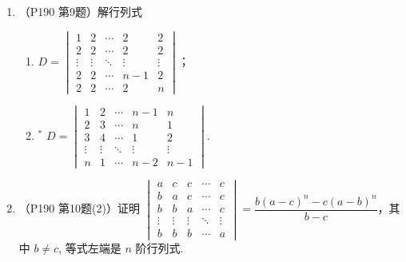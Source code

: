 \begin{enumerate}
\begin{enumerate}[label=(\arabic*)]
 \end{enumerate}

    \item （P190 第9题）解行列式
    \begin{enumerate}[label=(\arabic*)]
        \item $D=\begin{vmatrix}
        1 & 2 & \cdots & 2 & 2 \\
        2 & 2 & \cdots & 2 & 2 \\
        \vdots & \vdots & \ddots & \vdots & \vdots \\
        2 & 2 & \cdots & n-1 & 2 \\
        2 & 2 & \cdots & 2 & n\end{vmatrix}$；

        \item $^*$ $D=\begin{vmatrix}
            1 & 2 & \cdots & n-1 & n \\
            2 & 3 & \cdots & n & 1 \\
            3 & 4 & \cdots & 1 & 2 \\
            \vdots & \vdots & \ddots & \vdots & \vdots \\
            n & 1 & \cdots & n-2 & n-1
        \end{vmatrix}$.
    \end{enumerate}

    \item （P190 第10题(2)）证明
    $\begin{vmatrix}
        a & c & c & \cdots & c \\
        b & a & c & \cdots & c \\
        b & b & a & \cdots & c \\
        \vdots & \vdots & \vdots & \ddots & \vdots \\
        b & b & b & \cdots & a
    \end{vmatrix}=\dfrac{b(a-c)^{n}-c(a-b)^{n}}{b-c}$，其中 $b \neq c$, 等式左端是 $n$ 阶行列式.
\end{enumerate}
